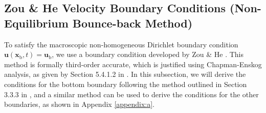 \documentclass[a4paper, 11pt]{report}
\begin{document}
\subsection{Zou \& He Velocity Boundary Conditions (Non-Equilibrium Bounce-back Method)}
To satisfy the macroscopic non-homogeneous Dirichlet boundary condition $\mathbf{u}(\mathbf{x}_\mathrm{b},t) = \mathbf{u}_\mathrm{b}$, we use a boundary condition developed by Zou \& He \cite{Zou_1997}. This method is formally third-order accurate, which is justified using Chapman-Enskog analysis, as given by Section 5.4.1.2 in \cite{lbtextbook}. In this subsection, we will derive the conditions for the bottom boundary following the method outlined in Section 3.3.3 in \cite{mp}, and a similar method can be used to derive the conditions for the other boundaries, as shown in Appendix \ref{appendix:a}.
\end{document}
